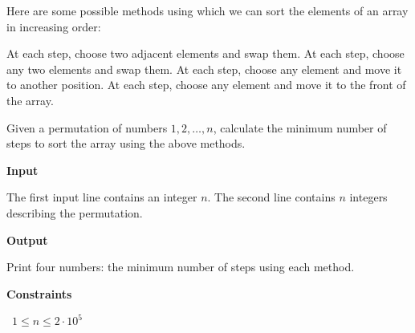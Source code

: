 Here are some possible methods using which we can sort the elements of an array in increasing order:

At each step, choose two adjacent elements and swap them.
At each step, choose any two elements and swap them.
At each step, choose any element and move it to another position.
At each step, choose any element and move it to the front of the array.

Given a permutation of numbers $1,2,\ldots,n$, calculate the minimum number of steps to sort the array using the above methods.

\vspace{0.3cm}\noindent\textbf{Input}

The first input line contains an integer $n$.
The second line contains $n$ integers describing the permutation.

\vspace{0.3cm}\noindent\textbf{Output}

Print four numbers: the minimum number of steps using each method.

\vspace{0.3cm}\noindent\textbf{Constraints}

\textbullet\ $1 \le n \le 2 \cdot 10^5$